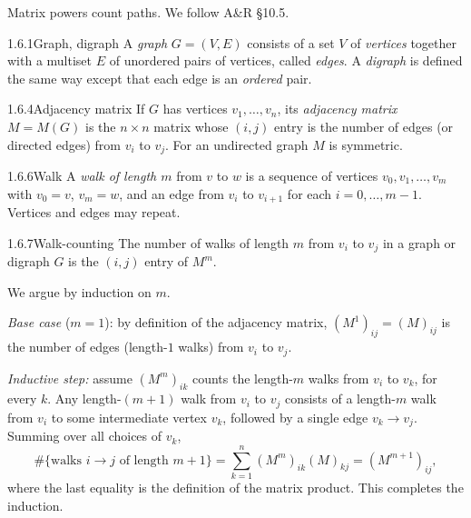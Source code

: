 Matrix powers count paths. We follow A\&R \S10.5.

\begin{defns}{1.6.1}{Graph, digraph}
A \emph{graph} $G=(V,E)$ consists of a set $V$ of \emph{vertices} together with a multiset $E$ of unordered pairs of vertices, called \emph{edges}. A \emph{digraph} is defined the same way except that each edge is an \emph{ordered} pair.
\end{defns}

\begin{defns}{1.6.4}{Adjacency matrix}
If $G$ has vertices $v_1,\dots,v_n$, its \emph{adjacency matrix} $M=M(G)$ is the $n\times n$ matrix whose $(i,j)$ entry is the number of edges (or directed edges) from $v_i$ to $v_j$. For an undirected graph $M$ is symmetric.
\end{defns}

\begin{defns}{1.6.6}{Walk}
A \emph{walk of length $m$} from $v$ to $w$ is a sequence of vertices $v_0,v_1,\dots,v_m$ with $v_0=v$, $v_m=w$, and an edge from $v_i$ to $v_{i+1}$ for each $i=0,\dots,m-1$. Vertices and edges may repeat.
\end{defns}

\begin{thms}{1.6.7}{Walk-counting}
The number of walks of length $m$ from $v_i$ to $v_j$ in a graph or digraph $G$ is the $(i,j)$ entry of $M^m$.
\end{thms}

\begin{prf}
We argue by induction on $m$.

\emph{Base case} ($m=1$): by definition of the adjacency matrix, $(M^1)_{ij}=(M)_{ij}$ is the number of edges (length-$1$ walks) from $v_i$ to $v_j$.

\emph{Inductive step:} assume $(M^m)_{ik}$ counts the length-$m$ walks from $v_i$ to $v_k$, for every $k$. Any length-$(m{+}1)$ walk from $v_i$ to $v_j$ consists of a length-$m$ walk from $v_i$ to some intermediate vertex $v_k$, followed by a single edge $v_k\to v_j$. Summing over all choices of $v_k$,
\[
\#\{\text{walks }i\to j\text{ of length }m{+}1\}=\sum_{k=1}^n (M^m)_{ik}(M)_{kj}=(M^{m+1})_{ij},
\]
where the last equality is the definition of the matrix product. This completes the induction.
\end{prf}

